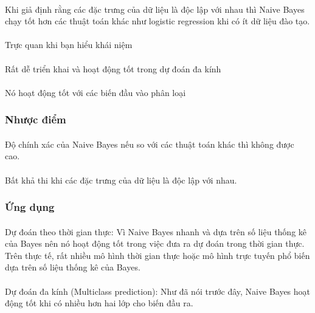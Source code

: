 \documentclass{article}
\begin{document}
\paragraph{}
Khi giả định rằng các đặc trưng của dữ liệu là độc lập với nhau thì Naive Bayes chạy tốt hơn các thuật toán khác như logistic regression khi có ít dữ liệu đào tạo.
\paragraph{}Trực quan khi bạn hiểu khái niệm
\paragraph{}Rất dễ triển khai và hoạt động tốt trong dự đoán đa kính
\paragraph{}Nó hoạt động tốt với các biến đầu vào phân loại
\subsubsection{Nhược điểm}
\paragraph{}Độ chính xác của Naive Bayes nếu so với các thuật toán khác thì không được cao.
\paragraph{}
Bất khả thi khi các đặc trưng của dữ liệu là độc lập với nhau.
\subsubsection{Ứng dụng}
\paragraph{}
Dự đoán theo thời gian thực: Vì Naive Bayes nhanh và dựa trên số liệu thống kê của Bayes nên nó hoạt động tốt trong việc đưa ra dự đoán trong thời gian thực. Trên thực tế, rất nhiều mô hình thời gian thực hoặc mô hình trực tuyến phổ biến dựa trên số liệu thống kê của Bayes.
\paragraph{}Dự đoán đa kính (Multiclass prediction): Như đã nói trước đây, Naive Bayes hoạt động tốt khi có nhiều hơn hai lớp cho biến đầu ra.
\end{document}
